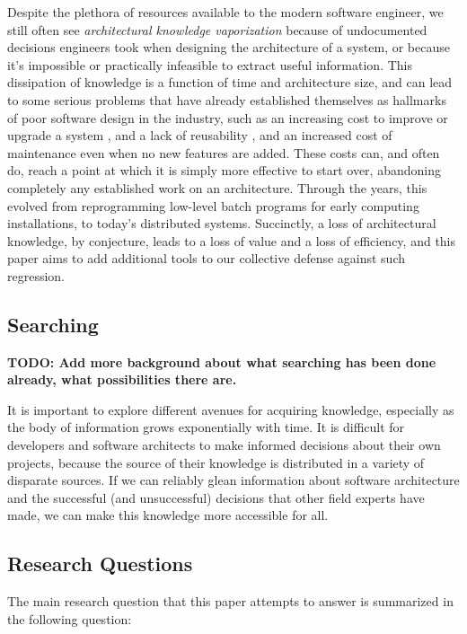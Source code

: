 \documentclass[a4paper, 12pt]{article}
\begin{document}
		Despite the plethora of resources available to the modern software engineer, we still often see \textit{architectural knowledge vaporization}\autocite{jansen} because of undocumented decisions engineers took when designing the architecture of a system, or because it's impossible or practically infeasible to extract useful information. This dissipation of knowledge is a function of time and architecture size, and can lead to some serious problems that have already established themselves as hallmarks of poor software design in the industry, such as an increasing cost to improve or upgrade a system \autocite{jansen, perry}, and a lack of reusability \autocite{jansen}, and an increased cost of maintenance \autocite{randell} even when no new features are added. These costs can, and often do, reach a point at which it is simply more effective to start over, abandoning completely any established work on an architecture. Through the years, this evolved from reprogramming low-level batch programs for early computing installations\autocite{randell}, to today's distributed systems. Succinctly, a loss of architectural knowledge, by conjecture, leads to a loss of value and a loss of efficiency, and this paper aims to add additional tools to our collective defense against such regression.
		
	\subsection{Searching}
		\textbf{TODO: Add more background about what searching has been done already, what possibilities there are.}
	
		It is important to explore different avenues for acquiring knowledge, especially as the body of information grows exponentially with time. It is difficult for developers and software architects to make informed decisions about their own projects, because the source of their knowledge is distributed in a variety of disparate sources. If we can reliably glean information about software architecture and the successful (and unsuccessful) decisions that other field experts have made, we can make this knowledge more accessible for all.
		
	\subsection{Research Questions}
		The main research question that this paper attempts to answer is summarized in the following question:
		
\end{document}
